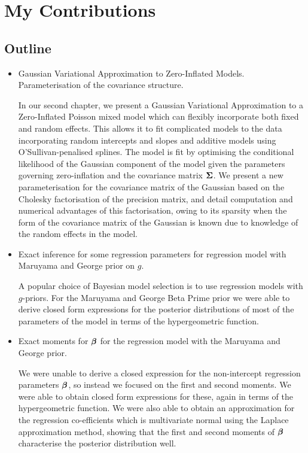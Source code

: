 \section{My Contributions}
\subsection{Outline}
\begin{itemize}
	\item Gaussian Variational Approximation to Zero-Inflated Models. Parameterisation of the covariance structure.

	In our second chapter, we present a Gaussian Variational Approximation to a Zero-Inflated Poisson mixed model
	which can flexibly incorporate both fixed and random effects. This allows it to fit complicated models
	to the data incorporating random intercepts and slopes and additive models using O'Sullivan-penalised splines.
	The model is fit by optimising the conditional likelihood of the Gaussian component of the model given the
	parameters governing zero-inflation and the covariance matrix ${\boldsymbol \Sigma}$.
	We present a new parameterisation for the covariance matrix of the Gaussian based on the Cholesky
	factorisation of the precision matrix, and detail computation and numerical advantages of this
	factorisation, owing to its sparsity when the form of the covariance matrix of the Gaussian is known due to
	knowledge of the random effects in the model.

	\item Exact inference for some regression parameters for regression model with Maruyama and George prior on $g$.

	A popular choice of Bayesian model selection is to use regression models with $g$-priors. For the Maruyama
	and George Beta Prime prior \citep{Maruyama2011} we were able to derive closed form expressions for the
	posterior distributions of most of the parameters of the model in terms of the hypergeometric function.

	\item Exact moments for ${\boldsymbol \beta}$ for the regression model with the Maruyama and George prior.

	We were unable to derive a closed expression for the non-intercept regression parameters ${\boldsymbol \beta}$, so instead
	we focused on the first and second moments. We were able to obtain closed form expressions for these,
	again in terms of the hypergeometric function. We were also able to obtain an approximation for the
	regression co-efficients which is multivariate normal using the Laplace approximation method, showing
	that the first and second moments of ${\boldsymbol \beta}$ characterise the posterior distribution well.


\end{itemize}
